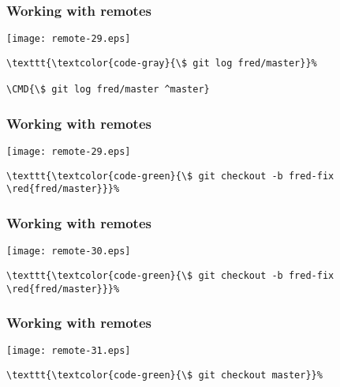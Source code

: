 \documentclass[english]{beamer}
\newcommand{\CMD}[1]{%
\texttt{\textcolor{code-green}{#1}}%
}
\newcommand{\fnt}[1]{%
\texttt{\textcolor{code-gray}{#1}}%
}
\newcommand{\red}[1]{%
\textcolor{code-red}{#1}%
}
\begin{document}
\begin{frame}[fragile]
\frametitle{Working with remotes}

\texttt{[image: remote-29.eps]}

\begin{Verbatim}[commandchars=\\\{\}]
\fnt{\$ git log fred/master}
\CMD{\$ git log fred/master ^master}
\end{Verbatim}

\vspace{\textheight}
\end{frame}

\begin{frame}[fragile]
\frametitle{Working with remotes}

\texttt{[image: remote-29.eps]}

\begin{Verbatim}[commandchars=\\\{\}]
\CMD{\$ git checkout -b fred-fix \red{fred/master}}
\end{Verbatim}

\vspace{\textheight}
\end{frame}

\begin{frame}[fragile]
\frametitle{Working with remotes}

\texttt{[image: remote-30.eps]}

\begin{Verbatim}[commandchars=\\\{\}]
\CMD{\$ git checkout -b fred-fix \red{fred/master}}
\end{Verbatim}

\vspace{\textheight}
\end{frame}

\begin{frame}[fragile]
\frametitle{Working with remotes}

\texttt{[image: remote-31.eps]}

\begin{Verbatim}[commandchars=\\\{\}]
\CMD{\$ git checkout master}
\end{Verbatim}

\vspace{\textheight}
\end{frame}
\end{document}

